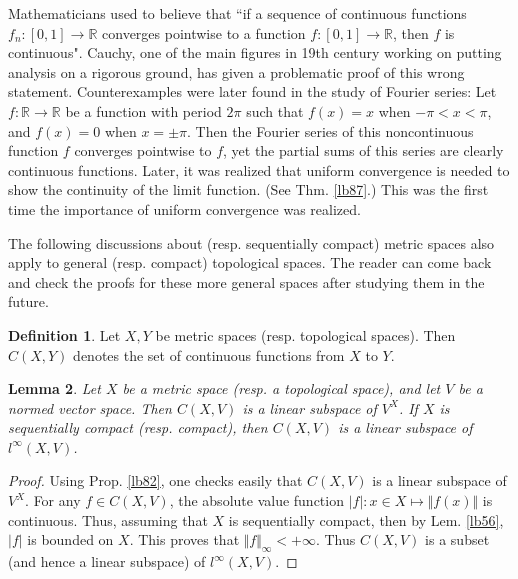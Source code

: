 \documentclass[12pt,b5paper,notitlepage]{article}
\theoremstyle{definition}
\newtheorem{df}{Definition}[section]
\theoremstyle{plain}
\newtheorem{lm}[df]{Lemma}
\newcommand{\Rbb}{\mathbb R}
\numberwithin{equation}{section}
\begin{document}
Mathematicians used to believe that ``if a sequence of continuous functions $f_n:[0,1]\rightarrow\Rbb$ converges pointwise to a function $f:[0,1]\rightarrow\Rbb$, then $f$ is continuous". Cauchy, one of the main figures in 19th century working on putting analysis on a rigorous ground, has given a problematic proof of this wrong statement. Counterexamples were later found in the study of Fourier series: Let $f:\Rbb\rightarrow\Rbb$ be a function with period $2\pi$ such that $f(x)=x$ when $-\pi<x<\pi$, and $f(x)=0$ when $x=\pm \pi$. Then the Fourier series  of this noncontinuous function $f$ converges pointwise to $f$, yet the partial sums of this series are clearly continuous functions. Later, it was realized that uniform convergence is needed to show the continuity of the limit function. (See Thm. \ref{lb87}.) This was the first time the importance of uniform convergence was realized.



The following discussions about (resp. sequentially compact) metric spaces also apply to general (resp. compact) topological spaces. The reader can come back and check the proofs for these more general spaces after studying them in the future.

\begin{df}
Let $X,Y$ be  metric spaces (resp. topological spaces). Then $C(X,Y)$  denotes the set of continuous functions from $X$ to $Y$. 
\end{df}


\begin{lm}
Let $X$ be a metric space (resp. a topological space), and let $V$ be a normed vector space. Then $C(X,V)$ is a linear subspace of $V^X$. If $X$ is sequentially compact (resp. compact), then $C(X,V)$ is a linear subspace of $l^\infty(X,V)$.
\end{lm}

\begin{proof}
Using Prop. \ref{lb82}, one checks easily that $C(X,V)$ is a linear subspace of $V^X$.  For any $f\in C(X,V)$, the absolute value function $|f|:x\in X\mapsto\Vert f(x)\Vert$ is continuous. Thus, assuming that $X$ is sequentially compact, then by Lem. \ref{lb56}, $|f|$ is bounded on $X$. This proves that $\Vert f\Vert_\infty<+\infty$. Thus $C(X,V)$ is a subset (and hence a linear subspace) of $l^\infty(X,V)$. 
\end{proof}
\end{document}
